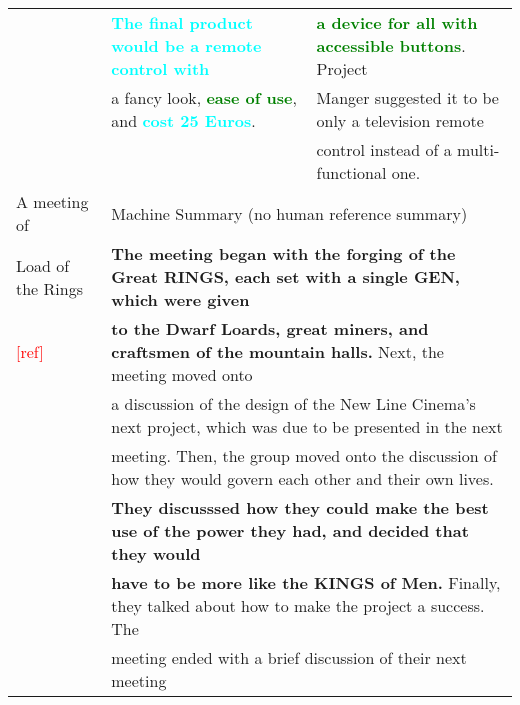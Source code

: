 \begin{table*}[h]
\begin{center}
\begin{tabular}{l|l|l}
					 & \textbf{\textcolor{cyan}{The final product would be a remote control with }} & \textbf{\textcolor{green}{a device for all with accessible buttons}}. Project \\
					 & a fancy look, \textbf{\textcolor{green}{ease of use}}, and \textbf{\textcolor{cyan}{cost 25 Euros}}. & Manger suggested it to be only a television remote \\
					 & & control instead of a multi-functional one. \\
					 \hline
					 A meeting of & \multicolumn{2}{l}{Machine Summary (no human reference summary)}\\
					 Load of the Rings & \multicolumn{2}{l}{\textbf{The meeting began with the forging of the Great RINGS, each set with a single GEN, which were given}} \\
					\textcolor{red}{[ref]}   & \multicolumn{2}{l}{\textbf{to the Dwarf Loards, great miners, and craftsmen of the  mountain halls.} Next, the meeting moved onto} \\
					 & \multicolumn{2}{l}{a discussion of the design of the New Line Cinema's next project, which was due to be presented in the next} \\
					 & \multicolumn{2}{l}{meeting. Then, the group moved onto the discussion of how they would govern each other and their own lives. } \\
					 & \multicolumn{2}{l}{\textbf{They discusssed how they could make the best use of the power they had, and decided that they would}} \\
					 & \multicolumn{2}{l}{\textbf{have to be more like the KINGS of Men.} Finally, they talked about how to make the project a success. The} \\
					 & \multicolumn{2}{l}{meeting ended with a brief discussion of their next meeting} \\
					 \hline
						\end{tabular}
			\end{center}
\end{table*}






